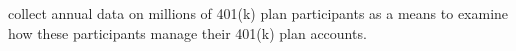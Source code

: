\documentclass{article}
\begin{document}
collect annual data on millions of 401(k) plan participants as a means to examine how these participants manage their 401(k) plan accounts. 

\end{document}
